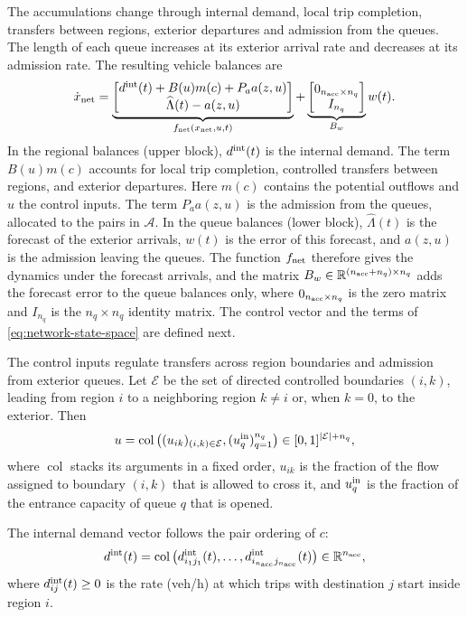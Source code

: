 \documentclass[final]{cas-sc}
\theoremstyle{definition}
\theoremstyle{plain}
\theoremstyle{definition}
\theoremstyle{plain}
\newcommand{\R}{\mathbb{R}}
\begin{document}
The accumulations change through internal demand, local trip
completion, transfers between regions, exterior departures and
admission from the queues. The length of each queue increases at its
exterior arrival rate and decreases at its admission rate. The
resulting vehicle balances are
\begin{equation}
\dot x_{\rm net}
=\underbrace{\begin{bmatrix}
d^{\rm int}(t)+B(u)m(c)+P_a a(z,u)\\
\widehat\Lambda(t)-a(z,u)
\end{bmatrix}}_{f_{\rm net}(x_{\rm net},u,t)}
+\underbrace{\begin{bmatrix}0_{n_{\rm acc}\times n_q}\\I_{n_q}\end{bmatrix}}_{B_w}w(t).
\label{eq:network-state-space}
\end{equation}
In the regional balances (upper block), $d^{\rm int}(t)$ is the
internal demand. The term $B(u)m(c)$ accounts for local trip completion,
controlled transfers between regions, and exterior departures. Here
$m(c)$ contains the potential outflows and $u$ the control inputs.
The term $P_a a(z,u)$ is the admission from the queues, allocated to
the pairs in $\mathcal A$. In
the queue balances (lower block), $\widehat\Lambda(t)$ is
the forecast of the exterior arrivals, $w(t)$ is the error of this
forecast, and
$a(z,u)$ is the admission leaving the queues. The function
$f_{\rm net}$ therefore gives the dynamics under the forecast arrivals,
and the matrix $B_w\in\R^{(n_{\rm acc}+n_q)\times n_q}$ adds the
forecast error to the queue balances only, where
$0_{n_{\rm acc}\times n_q}$ is the zero matrix and $I_{n_q}$ is the
$n_q\times n_q$ identity matrix. The control vector and the terms of
\eqref{eq:network-state-space} are defined next.

The control inputs regulate transfers across region boundaries and
admission from exterior queues. Let $\mathcal E$ be the set of directed controlled boundaries
$(i,k)$, leading from region $i$ to a neighboring region $k\ne i$ or,
when $k=0$, to the exterior. Then
\[
u=\operatorname{col}\big((u_{ik})_{(i,k)\in\mathcal E},
                        (u_q^{\rm in})_{q=1}^{n_q}\big)
\in[0,1]^{|\mathcal E|+n_q},
\]
where $\operatorname{col}$ stacks its arguments in a fixed order,
$u_{ik}$ is the fraction of the flow assigned to boundary $(i,k)$ that
is allowed to cross it, and $u_q^{\rm in}$ is the fraction of the
entrance capacity of queue $q$ that is opened.

The internal demand vector follows the pair ordering of $c$:
\[
d^{\rm int}(t)=\operatorname{col}\big(d^{\rm int}_{i_1j_1}(t),\ldots,
d^{\rm int}_{i_{n_{\rm acc}}j_{n_{\rm acc}}}(t)\big)\in\R^{n_{\rm acc}},
\]
where $d_{ij}^{\rm int}(t)\ge0$ is the rate (veh/h) at which trips with
destination $j$ start inside region $i$.
\end{document}

